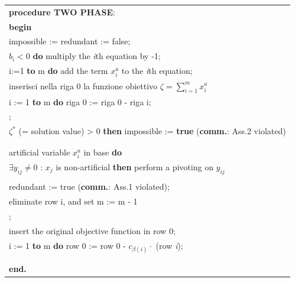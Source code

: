 \documentclass[11pt]{book}
\begin{document}
\small
\vspace{11pt}
\begin{center}
\begin{tabular}{||l||}
\hline\hline
{\bf procedure TWO PHASE}:\\
{\bf begin}\\
\phantom{aa}impossible := redundant := false;\\
\phantom{aa}{\bf for each} $b_i < 0$ {\bf do} multiply the {\em i}th equation by -1;\\
\phantom{aa}{\bf for} i:=1 {\bf to} m {\bf do} add the term $x_i^a$ to the {\em i}th equation;\\
\phantom{aa}inserisci nella riga 0 la funzione obiettivo $\zeta = \sum\limits_{i=1}^m x_i^a$\\
\phantom{aa}{\bf for} i := 1 {\bf to} m {\bf do} riga 0 := riga 0 - riga i;\\
\phantom{aa}{\bf call SIMPLEX};\\
\phantom{aa}\phantom{aa}\phantom{aa}{\bf if} $\zeta^*$ (= solution value) > 0 {\bf then} impossible := {\bf true} ({\bf comm.}: Ass.2 violated)\\ 
\phantom{aa}{\bf else}\\
\phantom{aaaa}{\bf begin}\\
\phantom{aaaaaa}{\bf for each} artificial variable $x_i^a$ in base {\bf do}\\
\phantom{aaaaaaaa}{\bf if} $\exists y_{ij} \ne 0$ : $x_j$ is non-artificial {\bf then} perform a pivoting on $y_{ij}$\\
\phantom{aaaaaaaa}{\bf else begin}\\
\phantom{aaaaaaaaelsea}redundant := true ({\bf comm.}: Ass.1 violated);\\
\phantom{aaaaaaaaelsea}eliminate row i, and set m := m - 1\\
\phantom{aaaaaaaaelsea}{\bf end};\\
\phantom{aaaaaa}insert the original objective function in row 0;\\
\phantom{aaaaaa}{\bf for} i := 1 {\bf to} m {\bf do} row 0 := row 0 - $c_{\beta(i)} \cdot$ (row {\em i});\\
\phantom{aaaaaa}{\bf call SIMPLEX}\\
\phantom{aaaa}{\bf end}\\
{\bf end.}\\\hline\hline
\end{tabular}
\end{center}
\vspace{11pt}
\normalsize
\end{document}
